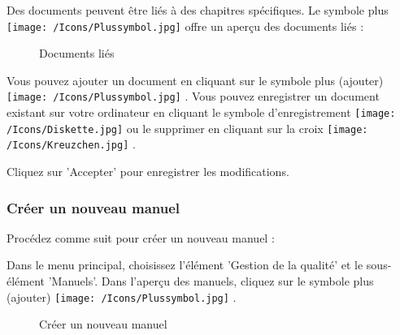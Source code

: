 Des documents peuvent être liés à des chapitres spécifiques. Le symbole plus \texttt{[image: /Icons/Plussymbol.jpg]}  offre un aperçu des documents liés :

\begin{figure}[H]
\caption{Documents liés}
\end{figure}

Vous pouvez ajouter un document en cliquant sur le symbole plus (ajouter) \texttt{[image: /Icons/Plussymbol.jpg]} . Vous pouvez enregistrer un document existant sur votre ordinateur en cliquant le symbole d'enregistrement \texttt{[image: /Icons/Diskette.jpg]}  ou le supprimer en cliquant sur la croix \texttt{[image: /Icons/Kreuzchen.jpg]} .

Cliquez sur 'Accepter'  pour enregistrer les modifications. 

\subsubsection{Créer un nouveau manuel}
\label{bkm:Ref930000788}

Procédez comme suit pour créer un nouveau manuel :

Dans le menu principal, choisissez l'élément 'Gestion de la qualité' et le sous-élément 'Manuels'. Dans l'aperçu des manuels, cliquez sur le symbole plus (ajouter) \texttt{[image: /Icons/Plussymbol.jpg]} .

\begin{figure}[H]
\caption{Créer un nouveau manuel}
\end{figure}

